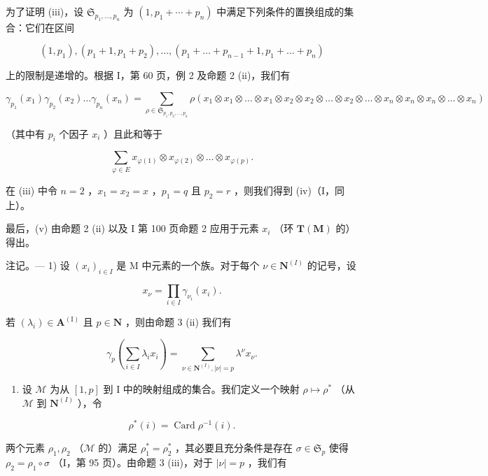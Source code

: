 为了证明 (iii)，设 \(\mathfrak{S}_{p_{1},\ldots,p_{n}}\) 为 \((1,p_{1}+\cdots+p_{n})\) 中满足下列条件的置换组成的集合：它们在区间

\[
\left(1, p _ {1}\right), \left(p _ {1} + 1, p _ {1} + p _ {2}\right), \dots , \left(p _ {1} + \dots + p _ {n - 1} + 1, p _ {1} + \dots + p _ {n}\right)
\]

上的限制是递增的。根据 I，第 60 页，例 2 及命题 2 (ii)，我们有

\[
\gamma_ {p _ {1}} \left(x _ {1}\right) \gamma_ {p _ {2}} \left(x _ {2}\right) \dots \gamma_ {p _ {n}} \left(x _ {n}\right) = \sum_ {\rho \in \mathfrak {S} _ {p _ {1}, p _ {2}, \dots , p _ {n}}} \rho \left(x _ {1} \otimes x _ {1} \otimes \dots \otimes x _ {1} \otimes x _ {2} \otimes x _ {2} \otimes \dots \otimes x _ {2} \otimes \dots \otimes x _ {n} \otimes x _ {n} \otimes x _ {n} \otimes \dots \otimes x _ {n}\right)
\]

（其中有 \(p_i\) 个因子 \(x_i\) ）且此和等于

\[
\sum_ {\varphi \in E} x _ {\varphi (1)} \otimes x _ {\varphi (2)} \otimes \dots \otimes x _ {\varphi (p)}.
\]

在 (iii) 中令 \(n = 2\) ，\(x_{1} = x_{2} = x\) ，\(p_{1} = q\) 且 \(p_{2} = r\) ，则我们得到 (iv)（I，同上）。

最后，(v) 由命题 2 (ii) 以及 I 第 100 页命题 2 应用于元素 \(x_{i}\) （环 \(\mathbf{T}(\mathbf{M})\) 的）得出。

注记。--- 1) 设 \((x_{i})_{i\in I}\) 是 M 中元素的一个族。对于每个 \(\nu \in \mathbf{N}^{(I)}\) 的记号，设

\[
x _ {\nu} = \prod_ {i \in I} \gamma_ {\nu_ {i}} (x _ {i}).
\]

若 \((\lambda_{i})\in \mathbf{A}^{(\mathrm{I})}\) 且 \(p\in \mathbf{N}\) ，则由命题 3 (ii) 我们有

\[
\gamma_ {p} \left(\sum_ {i \in I} \lambda_ {i} x _ {i}\right) = \sum_ {\nu \in \mathbf {N} ^ {(I)}, | \nu | = p} \lambda^ {\nu} x _ {\nu}.\tag{6}
\]

\begin{enumerate}
\def\labelenumi{\arabic{enumi})}
\setcounter{enumi}{1}
\tightlist
\item
  设 \(\mathcal{M}\) 为从 \([1, p]\) 到 I 中的映射组成的集合。我们定义一个映射 \(\rho \mapsto \rho^{*}\) （从 \(\mathcal{M}\) 到 \(\mathbf{N}^{(I)}\) ），令
\end{enumerate}

\[
\rho^ {*} (i) = \operatorname{Card} \rho^ {- 1} (i).
\]

两个元素 \(\rho_1, \rho_2\) （\(\mathcal{M}\) 的）满足 \(\rho_1^* = \rho_2^*\) ，其必要且充分条件是存在 \(\sigma \in \mathfrak{S}_p\) 使得 \(\rho_2 = \rho_1 \circ \sigma\) （I，第 95 页）。由命题 3 (iii)，对于 \(|\nu| = p\) ，我们有

